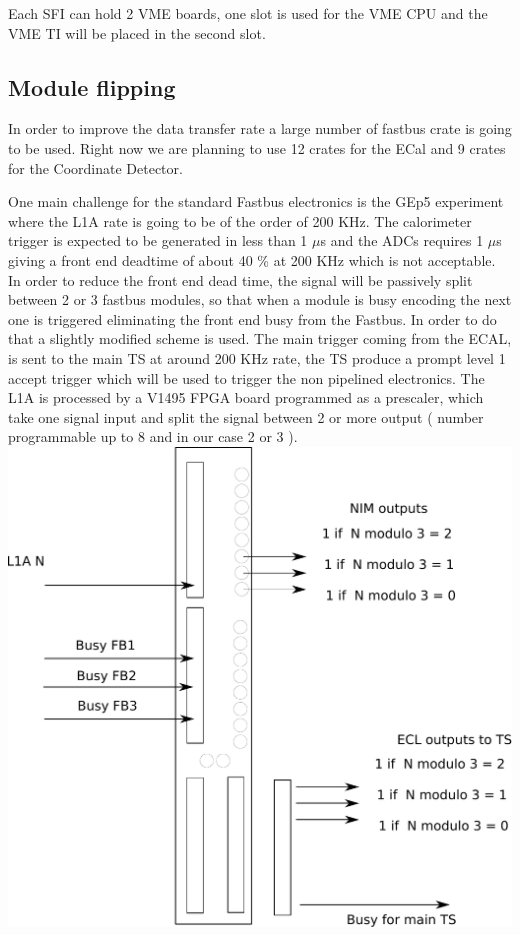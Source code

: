 \documentclass{article}
\begin{document}
Each SFI can hold 2 VME boards, one slot is used for the VME CPU and the VME TI will be placed in the second slot.

\subsection{Module flipping}
In order to improve the data transfer rate a large number of fastbus crate is going to be used.
Right now we are planning to use 12 crates for the ECal and 9 crates for the Coordinate Detector.

One main challenge for the standard Fastbus electronics is the GEp5 experiment where the L1A rate is going to be of the order of 200 KHz. The calorimeter trigger is expected to be generated in less than 1 $\mu$s and the ADCs requires 1 $\mu$s giving a front end deadtime of about 40 \% at 200 KHz which is not acceptable. In order to reduce the front end dead time, the signal will be passively split between 2 or 3 fastbus modules, so that when a module is busy encoding the next one is triggered eliminating the front end busy from the Fastbus.
In order to do that a slightly modified scheme is used.
The main trigger coming from the ECAL, is sent to the main TS at around 200 KHz rate, the TS produce a prompt level 1 accept trigger which will be used to trigger the non pipelined electronics. The L1A is processed by a V1495 FPGA board programmed as a prescaler, which take one signal input and split the signal between 2 or more output ( number programmable up to 8 and in our case 2 or 3 ).
\includegraphics[scale=0.55]{figs/FPGAFlip.pdf}\\
\end{document}
